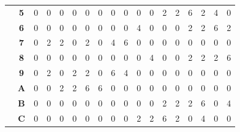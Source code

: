 \documentclass[fleqn]{article}
\begin{document}
\begin{table}[H]
\begin{tabular}{c|c|c|c|c|c|c|c|c|c|c|c|c|c|c|c|c|c|}
\multicolumn{1}{|c|}{}                                      & \textbf{5} & 0          & 0          & 0          & 0          & 0          & 0          & 0          & 0          & 0          & 0          & 2          & 2          & 6          & 2          & 4          & 0          \\ \cline{2-18} 
\multicolumn{1}{|c|}{}                                      & \textbf{6} & 0          & 0          & 0          & 0          & 0          & 0          & 0          & 0          & 4          & 0          & 0          & 0          & 2          & 2          & 6          & 2          \\ \cline{2-18} 
\multicolumn{1}{|c|}{}                                      & \textbf{7} & 0          & 2          & 2          & 0          & 2          & 0          & 4          & 6          & 0          & 0          & 0          & 0          & 0          & 0          & 0          & 0          \\ \cline{2-18} 
\multicolumn{1}{|c|}{}                                      & \textbf{8} & 0          & 0          & 0          & 0          & 0          & 0          & 0          & 0          & 0          & 4          & 0          & 0          & 2          & 2          & 2          & 6          \\ \cline{2-18} 
\multicolumn{1}{|c|}{}                                      & \textbf{9} & 0          & 2          & 0          & 2          & 2          & 0          & 6          & 4          & 0          & 0          & 0          & 0          & 0          & 0          & 0          & 0          \\ \cline{2-18} 
\multicolumn{1}{|c|}{}                                      & \textbf{A} & 0          & 0          & 2          & 2          & 6          & 6          & 0          & 0          & 0          & 0          & 0          & 0          & 0          & 0          & 0          & 0          \\ \cline{2-18} 
\multicolumn{1}{|c|}{}                                      & \textbf{B} & 0          & 0          & 0          & 0          & 0          & 0          & 0          & 0          & 0          & 0          & 2          & 2          & 2          & 6          & 0          & 4          \\ \cline{2-18} 
\multicolumn{1}{|c|}{}                                      & \textbf{C} & 0          & 0          & 0          & 0          & 0          & 0          & 0          & 0          & 2          & 2          & 6          & 2          & 0          & 4          & 0          & 0          \\ \cline{2-18} 

\end{tabular}
\end{table}
\end{document}
